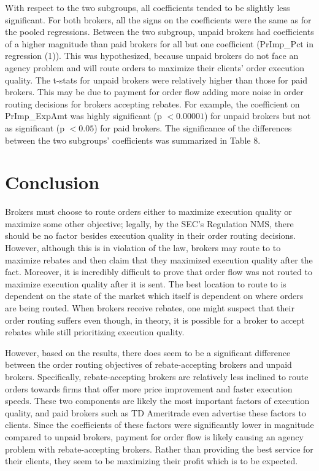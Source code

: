 \documentclass[12pt,a4paper]{article}
\begin{document}
		With respect to the two subgroups, all coefficients tended to be slightly less significant. For both brokers, all the signs on the coefficients were the same as for the pooled regressions. Between the two subgroup, unpaid brokers had coefficients of a higher magnitude than paid brokers for all but one coefficient (PrImp\_Pct in regression (1)). This was hypothesized, because unpaid brokers do not face an agency problem and will route orders to maximize their clients' order execution quality. The t-stats for unpaid brokers were relatively higher than those for paid brokers. This may be due to payment for order flow adding more noise in order routing decisions for brokers accepting rebates. For example, the coefficient on PrImp\_ExpAmt was highly significant (p $< 0.00001$) for unpaid brokers but not as significant (p $< 0.05$) for paid brokers. The significance of the differences between the two subgroups' coefficients was summarized in Table 8. 
	
\pagebreak
		
\section{Conclusion}

	Brokers must choose to route orders either to maximize execution quality or maximize some other objective; legally, by the SEC's Regulation NMS, there should be no factor besides execution quality in their order routing decisions.  However, although this is in violation of the law, brokers may route to to maximize rebates and then claim that they maximized execution quality after the fact. Moreover, it is incredibly difficult to prove that order flow was not routed to maximize execution quality after it is sent. The best location to route to is dependent on the state of the market which itself is dependent on where orders are being routed.  
	When brokers receive rebates, one might suspect that their order routing suffers even though, in theory, it is possible for a broker to accept rebates while still prioritizing execution quality.
	
	However, based on the results, there does seem to be a significant difference between the order routing objectives of rebate-accepting brokers and unpaid brokers. Specifically, rebate-accepting brokers are relatively less inclined to route orders towards firms that offer more price improvement and faster execution speeds. These two components are likely the most important factors of execution quality, and paid brokers such as TD Ameritrade even advertise these factors to clients. Since the coefficients of these factors were significantly lower in magnitude compared to unpaid brokers, payment for order flow is likely causing an agency problem with rebate-accepting brokers. Rather than providing the best service for their clients, they seem to be maximizing their profit which is to be expected. 
\end{document}
